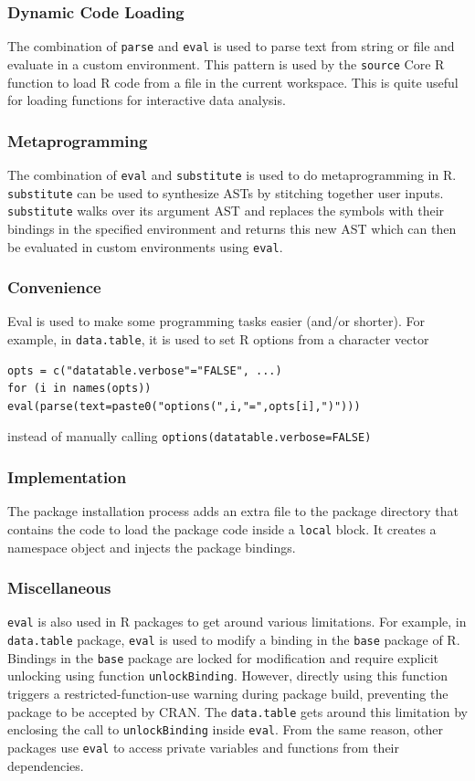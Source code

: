 \documentclass[USenglish,cleveref, autoref, thm-restate]{lipics-v2019}
\newcommand{\eval}{\texttt{eval}\xspace}
\renewcommand{\parse}{\c{parse}}
\newcommand{\source}{\c{source}}
\newcommand{\local}{\c{local}}
\newcommand{\unlockBinding}{\c{unlockBinding}}
\newcommand{\substitute}{\c{substitute}}
\newcommand{\datatable}{\c{data.table}}
\newcommand{\base}{\c{base}}
\renewcommand{\c}[1]{\lstinline{#1}\xspace}
\begin{document}
\subsubsection{Dynamic Code Loading} The combination of \parse and \eval is
used to parse text from string or file and evaluate in a custom environment.
This pattern is used by the \source Core R function to load R code from a
file in the current workspace. This is quite useful for loading functions
for interactive data analysis.

\subsubsection{Metaprogramming} The combination of \eval and \substitute is
 used to do metaprogramming in R. \substitute can be used to synthesize ASTs
 by stitching together user inputs. \substitute walks over its argument AST
 and replaces the symbols with their bindings in the specified environment
 and returns this new AST which can then be evaluated in custom environments
 using \eval.

  \subsubsection{Convenience} Eval is used to make some programming tasks easier (and/or shorter). For example, in \c{data.table}, it is used to set R options from a character vector
  \begin{lstlisting}
opts = c("datatable.verbose"="FALSE", ...)
for (i in names(opts)) eval(parse(text=paste0("options(",i,"=",opts[i],")")))

  \end{lstlisting}
  instead of manually calling \c{options(datatable.verbose=FALSE)}

  \subsubsection{Implementation}
  The package installation process adds an extra file to the package directory
  that contains the code to load the package code inside a \local block. It
  creates a namespace object and injects the package bindings.

  \subsubsection{Miscellaneous} \eval is also used in R packages to get around
  various limitations. For example, in \datatable package, \eval is used to
  modify a binding in the \base package of R. Bindings in the \base package are
  locked for modification and require explicit unlocking using 
  function \unlockBinding. However, directly using this function triggers a
  restricted-function-use warning during package build, preventing the package
  to be accepted by CRAN. The \datatable gets around this limitation by
  enclosing the call to \unlockBinding inside \eval. From the same reason, other
  packages use \eval to access private variables and functions from their
  dependencies.
\end{document}
